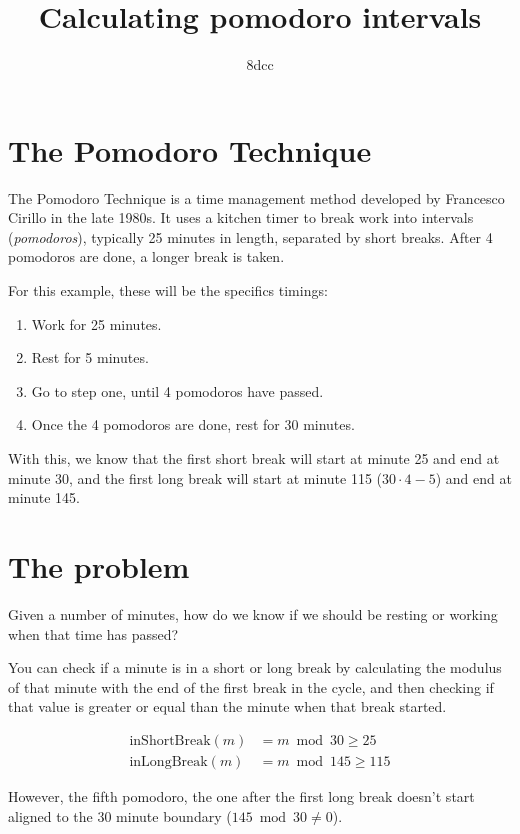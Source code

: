 \documentclass{amsart}
\title{Calculating pomodoro intervals}
\author{8dcc}
\begin{document}
\maketitle

\section{The Pomodoro Technique}

The Pomodoro Technique is a time management method developed by Francesco
Cirillo in the late 1980s. It uses a kitchen timer to break work into intervals
(\textit{pomodoros}), typically 25 minutes in length, separated by short
breaks. After 4 pomodoros are done, a longer break is taken.

For this example, these will be the specifics timings:

\begin{enumerate}
\item Work for 25 minutes.
\item Rest for 5 minutes.
\item Go to step one, until 4 pomodoros have passed.
\item Once the 4 pomodoros are done, rest for 30 minutes.
\end{enumerate}

With this, we know that the first short break will start at minute 25 and end at
minute 30, and the first long break will start at minute 115 ($30 \cdot 4 - 5$)
and end at minute 145.

\section{The problem}

Given a number of minutes, how do we know if we should be resting or working
when that time has passed?

You can check if a minute is in a short or long break by calculating the modulus
of that minute with the end of the first break in the cycle, and then checking
if that value is greater or equal than the minute when that break started.

\begin{align*}
  \text{inShortBreak}(m) &= m \bmod 30 \geq 25 \\
  \text{inLongBreak}(m)  &= m \bmod 145 \geq 115
\end{align*}

However, the fifth pomodoro, the one after the first long break doesn't start
aligned to the 30 minute boundary ($145 \bmod 30 \neq 0$).
\end{document}
